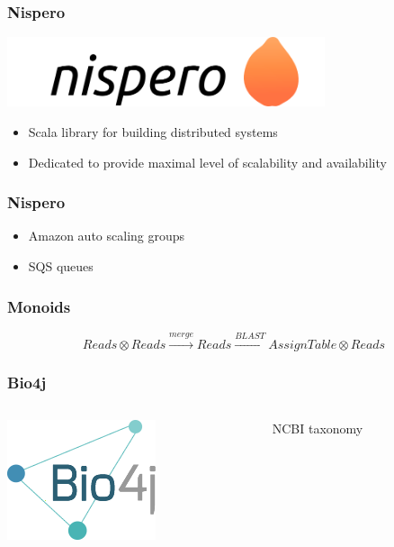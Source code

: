 \documentclass{beamer}
\begin{document}
\begin{frame}
\frametitle{Nispero}
\includegraphics[width=0.7\textwidth]{nispero.png}
\begin{itemize}
  \item Scala library for building distributed systems
  \item Dedicated to provide maximal level of scalability and availability
\end{itemize}
\end{frame}

\begin{frame}
\frametitle{Nispero}

\begin{itemize}
  \item Amazon auto scaling groups
  \item SQS queues
\end{itemize}
\end{frame}

\begin{frame}
\frametitle{Monoids}
$$ Reads \otimes Reads \xrightarrow{merge} Reads \xrightarrow{BLAST} AssignTable \otimes Reads $$

\end{frame}


\begin{frame}
\frametitle{Bio4j}

\begin{columns}[T]
		\begin{column}{.5\textwidth}
			\includegraphics[width=\textwidth]{bio4j.png}
		\end{column}
		\begin{column}{.5\textwidth}
			NCBI taxonomy
		\end{column}
	\end{columns}
\end{frame}
\end{document}

